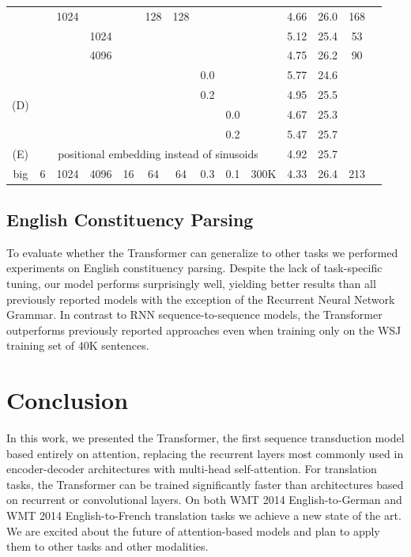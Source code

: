 \documentclass[10pt,letterpaper]{article}
\begin{document}
\begin{table}[t]
{\begin{tabular}{@{}cccccccccccccc@{}}
     &   & 1024&      &    & 128 & 128 &     &     &      & 4.66 & 26.0 & 168 \\
     &   &     & 1024 &    &     &     &     &     &      & 5.12 & 25.4 & 53  \\
     &   &     & 4096 &    &     &     &     &     &      & 4.75 & 26.2 & 90  \\
\midrule
\multirow{4}{*}{(D)}
     &   &     &      &    &     &     & 0.0 &     &      & 5.77 & 24.6 &     \\
     &   &     &      &    &     &     & 0.2 &     &      & 4.95 & 25.5 &     \\
     &   &     &      &    &     &     &     & 0.0 &      & 4.67 & 25.3 &     \\
     &   &     &      &    &     &     &     & 0.2 &      & 5.47 & 25.7 &     \\
\midrule
(E)  & \multicolumn{9}{c}{positional embedding instead of sinusoids} & 4.92 & 25.7 & \\
\midrule
big  & 6 & 1024 & 4096 & 16 & 64 & 64 & 0.3 & 0.1 & 300K & 4.33 & 26.4 & 213 \\
\bottomrule
\end{tabular}%
}
\end{table}

\subsection{English Constituency Parsing}
To evaluate whether the Transformer can generalize to other tasks we performed
experiments on English constituency parsing. Despite the lack of task-specific
tuning, our model performs surprisingly well, yielding better results than all
previously reported models with the exception of the Recurrent Neural Network
Grammar. In contrast to RNN sequence-to-sequence models, the Transformer
outperforms previously reported approaches even when training only on the WSJ
training set of 40K sentences.

\section{Conclusion}
In this work, we presented the Transformer, the first sequence transduction model
based entirely on attention, replacing the recurrent layers most commonly used in
encoder-decoder architectures with multi-head self-attention. For translation tasks,
the Transformer can be trained significantly faster than architectures based on
recurrent or convolutional layers. On both WMT 2014 English-to-German and WMT 2014
English-to-French translation tasks we achieve a new state of the art. We are
excited about the future of attention-based models and plan to apply them to other
tasks and other modalities.
\end{document}
